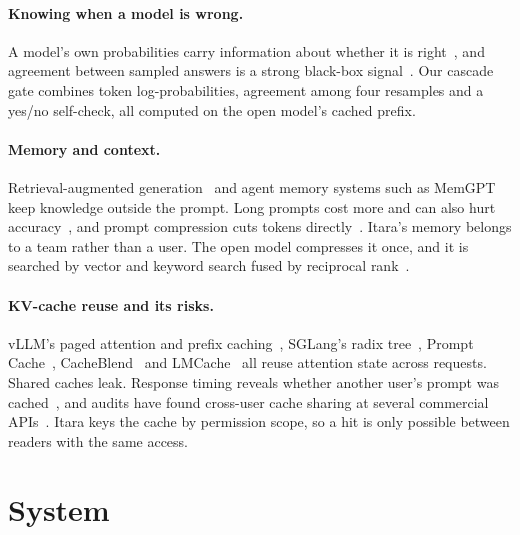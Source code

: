 \documentclass[10pt,twocolumn]{article}
\begin{document}
\paragraph{Knowing when a model is wrong.} A model's own probabilities carry information about whether it is right~\citep{kadavath2022know}, and agreement between sampled answers is a strong black-box signal~\citep{wang2023selfconsistency,manakul2023selfcheckgpt,kuhn2023semantic}. Our cascade gate combines token log-probabilities, agreement among four resamples and a yes/no self-check, all computed on the open model's cached prefix.

\paragraph{Memory and context.} Retrieval-augmented generation~\citep{lewis2020rag} and agent memory systems such as MemGPT~\citep{packer2023memgpt} keep knowledge outside the prompt. Long prompts cost more and can also hurt accuracy~\citep{liu2024lost,hong2025contextrot}, and prompt compression cuts tokens directly~\citep{jiang2023llmlingua}. Itara's memory belongs to a team rather than a user. The open model compresses it once, and it is searched by vector and keyword search fused by reciprocal rank~\citep{cormack2009rrf}.

\paragraph{KV-cache reuse and its risks.} vLLM's paged attention and prefix caching~\citep{kwon2023vllm}, SGLang's radix tree~\citep{zheng2024sglang}, Prompt Cache~\citep{gim2024promptcache}, CacheBlend~\citep{yao2025cacheblend} and LMCache~\citep{liu2025lmcache} all reuse attention state across requests. Shared caches leak. Response timing reveals whether another user's prompt was cached~\citep{song2024earlybird}, and audits have found cross-user cache sharing at several commercial APIs~\citep{gu2025auditing}. Itara keys the cache by permission scope, so a hit is only possible between readers with the same access.

\section{System}
\label{sec:system}
\end{document}
